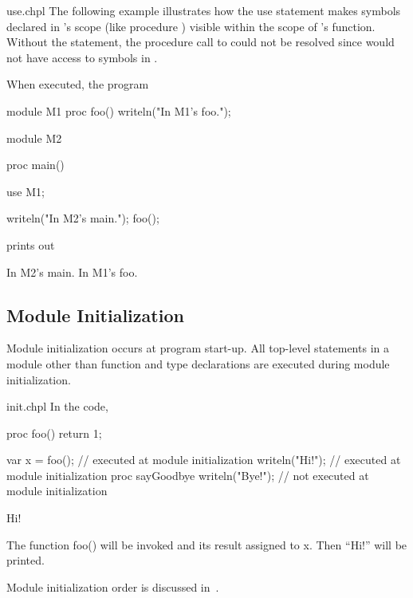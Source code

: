 \begin{chapelexample}{use.chpl}
  The following example illustrates how the use statement makes
  symbols declared in 's scope (like procedure
  ) visible within the scope of 's 
  function.  Without the  statement, the procedure call to
   could not be resolved since  would not have
  access to symbols in .

  When executed, the program
\begin{chapel}
module M1 {
  proc foo() {
    writeln("In M1's foo.");
  }
}

module M2 {
  proc main() {
    use M1;

    writeln("In M2's main.");
    foo();
  }
}
\end{chapel}
prints out
\begin{chapelprintoutput}{}
In M2's main.
In M1's foo.
\end{chapelprintoutput}
\end{chapelexample}



\subsection{Module Initialization}
\label{Module_Initialization}

Module initialization occurs at program start-up.  All top-level
statements in a module other than function and type declarations are
executed during module initialization.

\begin{chapelexample}{init.chpl}
In the code,
\begin{chapelpre}
proc foo() {
    return 1;
}
\end{chapelpre}
\begin{chapel}
var x = foo();       // executed at module initialization
writeln("Hi!");      // executed at module initialization
proc sayGoodbye {
  writeln("Bye!");   // not executed at module initialization
}
\end{chapel}
\begin{chapeloutput}
Hi!
\end{chapeloutput}
The function foo() will be invoked and its result assigned to x.  Then
``Hi!'' will be printed.
\end{chapelexample}

Module initialization order is discussed
in~.


